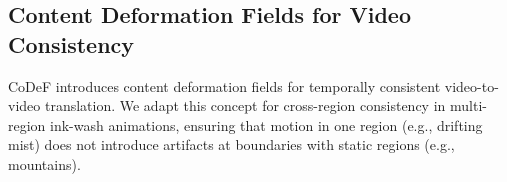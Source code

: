 \subsection{Content Deformation Fields for Video Consistency}

CoDeF \citep{ouyang2024codef} introduces content deformation fields
for temporally consistent video-to-video translation. We adapt this
concept for cross-region consistency in multi-region ink-wash
animations, ensuring that motion in one region (e.g., drifting
mist) does not introduce artifacts at boundaries with static
regions (e.g., mountains).
